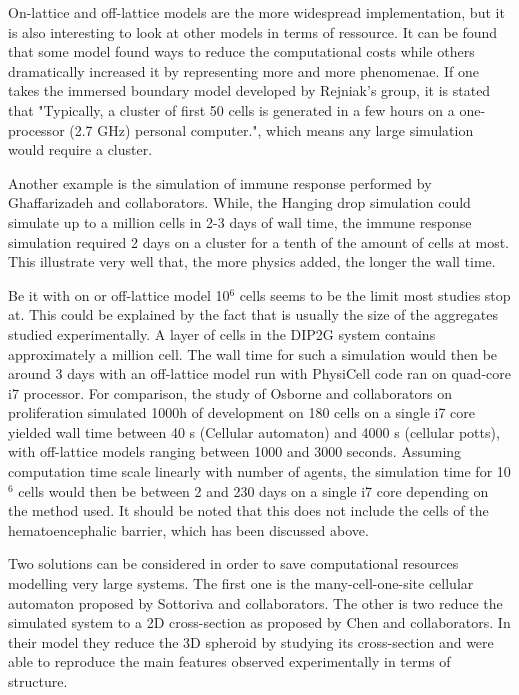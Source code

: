\documentclass[11pt,a4paper]{article}
\begin{document}
On-lattice and off-lattice models are the more widespread implementation, but it is also interesting to look at  other models in terms of ressource. It can be found that some model found ways to reduce the computational costs while others dramatically increased it by representing more and more phenomenae. If one takes the immersed boundary model developed by  Rejniak's group, it is stated that "Typically, a cluster of first 50 cells is generated in a few hours on a one-processor (2.7 GHz) personal computer."\cite{Rejniak2007}, which means any large simulation would require a cluster.

Another example is the simulation of immune response performed by  Ghaffarizadeh and collaborators.\cite{Ghaffarizadeh2017} While, the Hanging drop simulation could simulate up to a million cells in 2-3 days of wall time, the immune response simulation required 2 days on a cluster for a tenth of the amount of cells at most. This illustrate very well that, the more physics added, the longer the wall time.

Be it with on or off-lattice model 10$^6$ cells seems to be the limit most studies stop at. This could be explained by the fact that is usually the size of the aggregates studied experimentally. A layer of cells in the DIP2G system contains approximately a million cell. The wall time for such a simulation would then be around 3 days with an off-lattice model run with PhysiCell code ran on quad-core i7 processor. For comparison, the study of Osborne and collaborators on proliferation simulated 1000h of development on 180 cells on a single i7 core yielded wall time between 40 s (Cellular automaton) and 4000 s (cellular potts), with off-lattice models ranging between 1000 and 3000 seconds. Assuming computation time scale linearly with number of agents, the simulation time for 10$^6$ cells would then be between 2 and 230 days on a single i7 core depending on the method used. It should be noted that this does not include the cells of the hematoencephalic barrier, which has been discussed above. 

Two solutions  can be considered in order to save computational resources modelling very large systems. The first one is the many-cell-one-site cellular automaton proposed by Sottoriva and collaborators.\cite{Sottoriva2012}\cite{Sottoriva2015} The other is two reduce the simulated system to a 2D cross-section as proposed by Chen and collaborators. \cite{Chen2018} In their model they reduce the 3D spheroid by studying its cross-section and were able to reproduce the main features observed experimentally in terms of structure.
\end{document}
